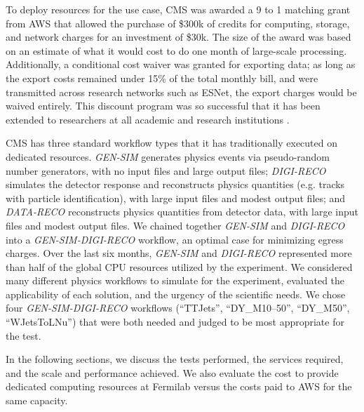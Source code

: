 \documentclass[twocolumn]{svjour3}          %
\begin{document}
To deploy resources for the use case, CMS was awarded a 9 to 1 matching grant from AWS that allowed the purchase of \$300k of credits for computing, storage, and network charges for an investment of \$30k.
The size of the award was based on an estimate of what it would cost to do one month of large-scale processing.
Additionally, a conditional cost waiver was granted for exporting data; as long as the export costs remained under 15\% of the total monthly bill, and were transmitted across research networks such as ESNet, the export charges would be waived entirely. This discount program was so successful that it has been extended to researchers
at all academic and research institutions \cite{CostWaiver}.

CMS has three standard workflow types that it has traditionally executed on dedicated resources.
{\it GEN-SIM} generates physics events via pseudo-random number generators, with no input files and large output files;
{\it DIGI-RECO} simulates the detector response and reconstructs physics quantities (e.g. tracks with particle identification), with large input files and modest output files; and
{\it DATA-RECO} reconstructs physics quantities from detector data, with large input files and modest output files.
We chained together {\it GEN-SIM} and {\it DIGI-RECO} into a {\it GEN-SIM-DIGI-RECO} workflow, an optimal case for minimizing egress charges.
Over the last six months, {\it GEN-SIM} and {\it DIGI-RECO} represented more than half of the global CPU resources utilized by the experiment.
We considered many different physics workflows to simulate for the experiment, evaluated the applicability of each solution, and the urgency of the scientific needs. We chose four {\it GEN-SIM-DIGI-RECO}
workflows (``TTJets'', ``DY\_M10--50'', ``DY\_M50'', ``WJetsToLNu'') that were both needed and judged to be most appropriate for the test.

In the following sections, we discuss the tests performed, the services required, and the scale and performance achieved. We also evaluate the cost to provide dedicated computing resources at Fermilab versus the costs paid to AWS for the same capacity.
\end{document}
